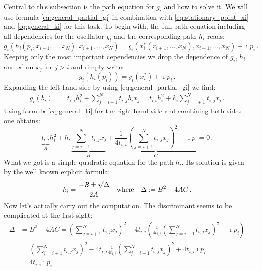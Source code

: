 \documentclass[a4paper,10pt]{article}
\begin{document}
Central to this subsection is the path equation for $g_i$ and how to
solve it. We will use formula \eqref{eq:general_partial_gi} in combination
with \eqref{eq:stationary_point_xi} and \eqref{eq:general_ki} for this task.
To begin with, the full path equation including all dependencies for the
oscillator $g_i$ and the corresponding path $h_i$ reads:
\begin{equation*}
  g_i\left(h_i\left(p_i, x_{i+1}, \ldots, x_N\right), x_{i+1}, \ldots, x_N\right)
  = g_i\left(x_i^{*}\left(x_{i+1}, \ldots, x_N\right), x_{i+1}, \ldots, x_N\right) + \imath p_i \,.
\end{equation*}
Keeping only the most important dependencies we drop the dependence
of $g_i$, $h_i$ and $x_i^{*}$ on $x_j$ for $j>i$ and simply write:
\begin{equation} \label{eq:general_path_eqn}
  g_i\left(h_i\left(p_i\right)\right) = g_i\left(x_i^*\right) + \imath p_i \,.
\end{equation}
Expanding the left hand side by using \eqref{eq:general_partial_gi} we find:
\begin{equation}
\begin{split}
  g_i\left(h_i\right)
  & = t_{i,i} h_i^2 + \sum_{j=i+1}^{N} t_{i,j} h_i x_j
    = t_{i,i} h_i^2 +  h_i \sum_{j=i+1}^{N} t_{i,j} x_j \,.
\end{split}
\end{equation}
Using formula \eqref{eq:general_ki} for the right hand side and
combining both sides one obtains:
\begin{equation}
  \underbrace{t_{i,i}}_{A} h_i^2
  +
  h_i \underbrace{\sum_{j=i+1}^{N} t_{i,j} x_j}_{B}
  +
  \underbrace{\frac{1}{4 t_{i,i}} \left( \sum_{j=i+1}^{N} t_{i,j} x_j \right)^2 - \imath p_i}_{C}
  = 0 \,.
\end{equation}
What we got is a simple quadratic equation for the path $h_i$.
Its solution is given by the well known explicit formula:
\begin{equation}
  h_i = \frac{-B \pm \sqrt{\Delta}}{2 A}
  \quad \text{where} \quad
  \Delta := B^2 - 4 A C \,.
\end{equation}
Now let's actually carry out the computation.
The discriminant seems to be complicated at the first sight:
\begin{equation}
\begin{split}
  \Delta & = B^2 - 4 A C
  = \left(\sum_{j=i+1}^{N} t_{i,j} x_j\right)^2
    - 4 t_{i,i} \left(\frac{1}{4 t_{i,i}} \left( \sum_{j=i+1}^{N} t_{i,j} x_j \right)^2 - \imath p_i\right) \\
  & = \left(\sum_{j=i+1}^{N} t_{i,j} x_j\right)^2
      - 4 t_{i,i} \frac{1}{4 t_{i,i}} \left( \sum_{j=i+1}^{N} t_{i,j} x_j \right)^2
      + 4 t_{i,i} \imath p_i \\
  & = 4 t_{i,i} \imath p_i
\end{split}
\end{equation}
\end{document}
